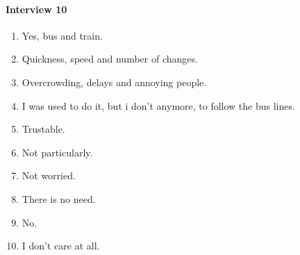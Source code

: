 \documentclass[a4paper, 11pt, twocolumn]{article}
\begin{document}
\paragraph*{Interview 10}\begin{enumerate}
	\item  Yes, bus and train.
	\item  Quickness, speed and number of changes.
	\item  Overcrowding, delays and annoying people.
	\item  I was used to do it, but i don't anymore, to follow the bus lines.
	\item  Trustable.
	\item  Not particularly.
	\item  Not worried.
	\item  There is no need.
	\item  No.
	\item  I don't care at all.
\end{enumerate}
\end{document}

